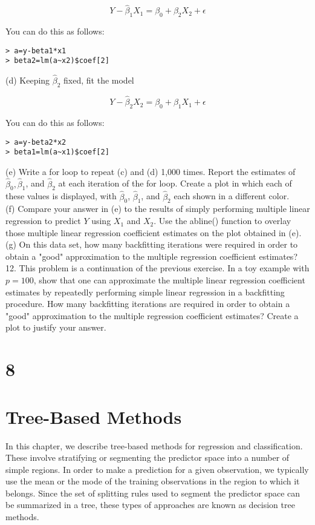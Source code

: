 \documentclass[10pt]{article}
\begin{document}
$$
Y-\hat{\beta}_{1} X_{1}=\beta_{0}+\beta_{2} X_{2}+\epsilon
$$

You can do this as follows:

\begin{verbatim}
> a=y-beta1*x1
> beta2=lm(a~x2)$coef[2]
\end{verbatim}

(d) Keeping $\hat{\beta}_{2}$ fixed, fit the model

$$
Y-\hat{\beta}_{2} X_{2}=\beta_{0}+\beta_{1} X_{1}+\epsilon
$$

You can do this as follows:

\begin{verbatim}
> a=y-beta2*x2
> beta1=lm(a~x1)$coef[2]
\end{verbatim}

(e) Write a for loop to repeat (c) and (d) 1,000 times. Report the estimates of $\hat{\beta}_{0}, \hat{\beta}_{1}$, and $\hat{\beta}_{2}$ at each iteration of the for loop. Create a plot in which each of these values is displayed, with $\hat{\beta}_{0}$, $\hat{\beta}_{1}$, and $\hat{\beta}_{2}$ each shown in a different color.\\
(f) Compare your answer in (e) to the results of simply performing multiple linear regression to predict $Y$ using $X_{1}$ and $X_{2}$. Use the abline() function to overlay those multiple linear regression coefficient estimates on the plot obtained in (e).\\
(g) On this data set, how many backfitting iterations were required in order to obtain a "good" approximation to the multiple regression coefficient estimates?\\
12. This problem is a continuation of the previous exercise. In a toy example with $p=100$, show that one can approximate the multiple linear regression coefficient estimates by repeatedly performing simple linear regression in a backfitting procedure. How many backfitting iterations are required in order to obtain a "good" approximation to the multiple regression coefficient estimates? Create a plot to justify your answer.


\section*{8}
\section*{Tree-Based Methods}
In this chapter, we describe tree-based methods for regression and classification. These involve stratifying or segmenting the predictor space into a number of simple regions. In order to make a prediction for a given observation, we typically use the mean or the mode of the training observations in the region to which it belongs. Since the set of splitting rules used to segment the predictor space can be summarized in a tree, these types of approaches are known as decision tree methods.
\end{document}
